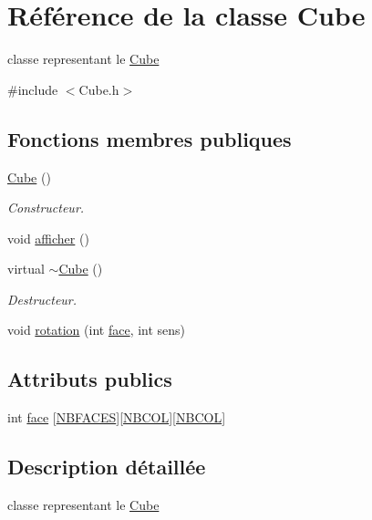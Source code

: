 \hypertarget{classCube}{}\section{Référence de la classe Cube}
\label{classCube}


classe representant le \hyperlink{classCube}{Cube}  




{\ttfamily \#include $<$Cube.\+h$>$}

\subsection*{Fonctions membres publiques}
\begin{DoxyCompactItemize}
\item 
\hyperlink{classCube_a06f3d86fb63e3aad08623610aa3c17b4}{Cube} ()
\begin{DoxyCompactList}\small\item\em Constructeur. \end{DoxyCompactList}\item 
void \hyperlink{classCube_af8b33ffb27c6e6ece613641cf76a646d}{afficher} ()
\item 
virtual \hyperlink{classCube_a600d629a60344171d18ae77b3fb43912}{$\sim$\+Cube} ()
\begin{DoxyCompactList}\small\item\em Destructeur. \end{DoxyCompactList}\item 
void \hyperlink{classCube_a9083ee3a1ea2734d5400623e8d6dadca}{rotation} (int \hyperlink{classCube_a9c7674b8acc767b6d9ed380374e9e6a4}{face}, int sens)
\end{DoxyCompactItemize}
\subsection*{Attributs publics}
\begin{DoxyCompactItemize}
\item 
int \hyperlink{classCube_a9c7674b8acc767b6d9ed380374e9e6a4}{face} \mbox{[}\hyperlink{Cube_8h_a535f51df55f93b8e3e096e3c870274a9}{N\+B\+F\+A\+C\+E\+S}\mbox{]}\mbox{[}\hyperlink{Cube_8h_a8f8cd1540fdc837cee034be5be8c2aa5}{N\+B\+C\+O\+L}\mbox{]}\mbox{[}\hyperlink{Cube_8h_a8f8cd1540fdc837cee034be5be8c2aa5}{N\+B\+C\+O\+L}\mbox{]}
\end{DoxyCompactItemize}


\subsection{Description détaillée}
classe representant le \hyperlink{classCube}{Cube} 

